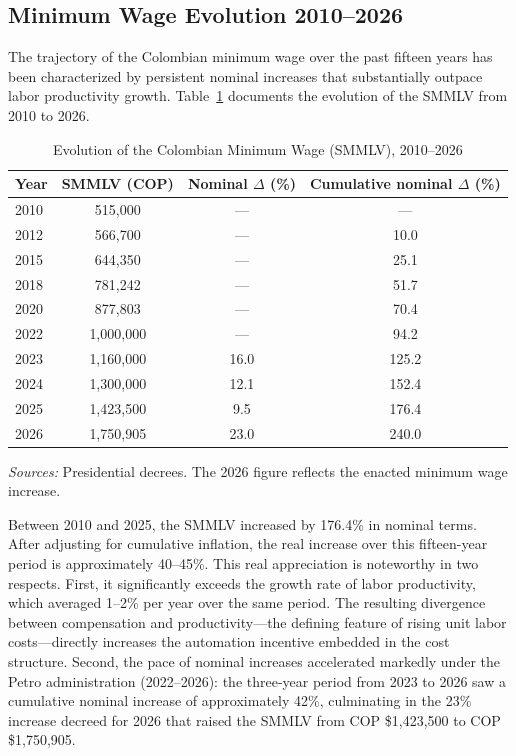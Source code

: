\subsection{Minimum Wage Evolution 2010--2026}
\label{subsec:min_wage}

The trajectory of the Colombian minimum wage over the past fifteen years has been characterized by persistent nominal increases that substantially outpace labor productivity growth. Table~\ref{tab:min_wage} documents the evolution of the SMMLV from 2010 to 2026.

\begin{table}[H]
\centering
\caption{Evolution of the Colombian Minimum Wage (SMMLV), 2010--2026}
\label{tab:min_wage}
\begin{threeparttable}
\begin{tabular}{lccc}
\toprule
\textbf{Year} & \textbf{SMMLV (COP)} & \textbf{Nominal $\Delta$ (\%)} & \textbf{Cumulative nominal $\Delta$ (\%)} \\
\midrule
2010 & 515,000 & --- & --- \\
2012 & 566,700 & --- & 10.0 \\
2015 & 644,350 & --- & 25.1 \\
2018 & 781,242 & --- & 51.7 \\
2020 & 877,803 & --- & 70.4 \\
2022 & 1,000,000 & --- & 94.2 \\
2023 & 1,160,000 & 16.0 & 125.2 \\
2024 & 1,300,000 & 12.1 & 152.4 \\
2025 & 1,423,500 & 9.5 & 176.4 \\
2026 & 1,750,905 & 23.0 & 240.0 \\
\bottomrule
\end{tabular}
\begin{tablenotes}
\small
\item \textit{Sources:} Presidential decrees. The 2026 figure reflects the enacted minimum wage increase.
\end{tablenotes}
\end{threeparttable}
\end{table}

Between 2010 and 2025, the SMMLV increased by 176.4\% in nominal terms. After adjusting for cumulative inflation, the real increase over this fifteen-year period is approximately 40--45\%. This real appreciation is noteworthy in two respects. First, it significantly exceeds the growth rate of labor productivity, which averaged 1--2\% per year over the same period. The resulting divergence between compensation and productivity---the defining feature of rising unit labor costs---directly increases the automation incentive embedded in the cost structure. Second, the pace of nominal increases accelerated markedly under the Petro administration (2022--2026): the three-year period from 2023 to 2026 saw a cumulative nominal increase of approximately 42\%, culminating in the 23\% increase decreed for 2026 that raised the SMMLV from COP \$1,423,500 to COP \$1,750,905.

